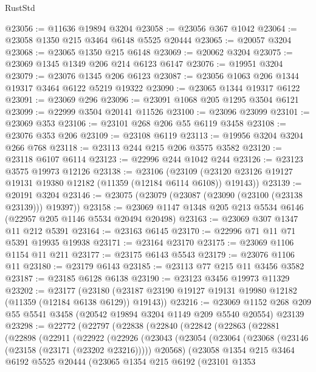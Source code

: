 \begin{lexlean}{RustStd}
\begin{coremodule}
{{{{{{{{{{{{{{{{{{{@23056 := @11636 @19894 @3204
@23058 := @23056 @367 @1042
@23064 := @23058 @1350 @215 @3464 @6148 @5525 @20444
@23065 := @20057 @3204
@23068 := @23065 @1350 @215 @6148
@23069 := @20062 @3204
@23075 := @23069 @1345 @1349 @206 @214 @6123 @6147
@23076 := @19951 @3204
@23079 := @23076 @1345 @206 @6123
@23087 := @23056 @1063 @206 @1344 @19317 @3464 @6122 @5219 @19322
@23090 := @23065 @1344 @19317 @6122
@23091 := @23069 @296
@23096 := @23091 @1068 @205 @1295 @3504 @6121
@23099 := @22999 @3504 @20141 @11526
@23100 := @23096 @23099
@23101 := @23069 @353
@23106 := @23101 @268 @206 @55 @6119 @3458
@23108 := @23076 @353 @206
@23109 := @23108 @6119
@23113 := @19956 @3204 @3204 @266 @768
@23118 := @23113 @244 @215 @206 @3575 @3582
@23120 := @23118 @6107 @6114
@23123 := @22996 @244 @1042 @244
@23126 := @23123 @3575 @19973 @12126
@23138 := @23106
    (@23109 (@23120 @23126 @19127 @19131 @19380 @12182 (@11359 (@12184 @6114 @6108)) @19143))
@23139 := @20191 @3204
@23146 := @23075 (@23079 (@23087 (@23090 (@23100 (@23138 @23139))) @19397))
@23158 := @23069 @1147 @1348 @205 @213 @5534 @6146 (@22957 @205 @1146 @5534 @20494 @20498)
@23163 := @23069 @307 @1347 @11 @212 @5391
@23164 := @23163 @6145
@23170 := @22996 @71 @11 @71 @5391 @19935 @19938
@23171 := @23164 @23170
@23175 := @23069 @1106 @1154 @11 @211
@23177 := @23175 @6143 @5543
@23179 := @23076 @1106 @11
@23180 := @23179 @6143
@23185 := @23113 @77 @215 @11 @3456 @3582
@23187 := @23185 @6128 @6138
@23190 := @23123 @3456 @19973 @11329
@23202 := @23177
    (@23180 (@23187 @23190 @19127 @19131 @19980 @12182 (@11359 (@12184 @6138 @6129)) @19143))
@23216 := @23069
    @1152
    @268
    @209
    @55
    @5541
    @3458
    (@20542 @19894 @3204 @1149 @209 @5540 @20554)
    @23139
@23298 := @22772
    (@22797
      (@22838
        (@22840
          (@22842
            (@22863
              (@22881
                (@22898
                  (@22911
                    (@22922
                      (@22926
                        (@23043
                          (@23054
                            (@23064 (@23068 (@23146 (@23158 (@23171 (@23202 @23216))))) @20568)
                            (@23058
                              @1354
                              @215
                              @3464
                              @6192
                              @5525
                              @20444
                              (@23065
                                @1354
                                @215
                                @6192
                                (@23101
                                  @1353
}}}}}}}}}}}}}}}}}}}
\end{coremodule}
\end{lexlean}
